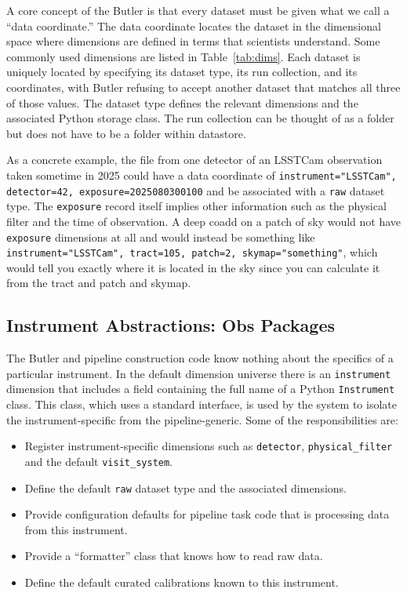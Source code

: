 A core concept of the Butler is that every dataset must be given what we call a ``data coordinate.''
The data coordinate locates the dataset in the dimensional space where dimensions are defined in terms that scientists understand.
Some commonly used dimensions are listed in Table~\ref{tab:dims}.
Each dataset is uniquely located by specifying its dataset type, its run collection, and its coordinates, with Butler refusing to accept another dataset that matches all three of those values.
The dataset type defines the relevant dimensions and the associated Python storage class.
The run collection can be thought of as a folder but does not have to be a folder within datastore.

As a concrete example, the file from one detector of an LSSTCam observation taken sometime in 2025 could have a data coordinate of \texttt{instrument="LSSTCam", detector=42, exposure=2025080300100} and be associated with a \texttt{raw} dataset type.
The \texttt{exposure} record itself implies other information such as the physical filter and the time of observation.
A deep coadd on a patch of sky would not have \texttt{exposure} dimensions at all and would instead be something like \texttt{instrument="LSSTCam", tract=105, patch=2, skymap="something"}, which would tell you exactly where it is located in the sky since you can calculate it from the tract and patch and skymap.

\subsection{Instrument Abstractions: Obs Packages}
\label{sec:obs_packages}

The Butler and pipeline construction code know nothing about the specifics of a particular instrument.
In the default dimension universe there is an \texttt{instrument} dimension that includes a field containing the full name of a Python \texttt{Instrument} class.
This class, which uses a standard interface, is used by the system to isolate the instrument-specific from the pipeline-generic.
Some of the responsibilities are:

\begin{itemize}
\item Register instrument-specific dimensions such as \texttt{detector}, \texttt{physical\_filter} and the default \texttt{visit\_system}.
\item Define the default \texttt{raw} dataset type and the associated dimensions.
\item Provide configuration defaults for pipeline task code that is processing data from this instrument.
\item Provide a ``formatter'' class that knows how to read raw data.
\item Define the default curated calibrations known to this instrument.
\end{itemize}

